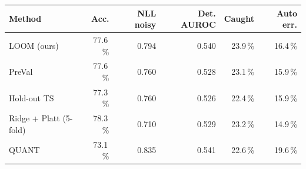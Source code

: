 \begin{tabular}{lrrrrr}
\toprule
Method & Acc. & NLL noisy & Det. AUROC & Caught & Auto err. \\
\midrule
LOOM (ours) & 77.6\,\% & 0.794 & 0.540 & 23.9\,\% & 16.4\,\% \\
PreVal & 77.6\,\% & 0.760 & 0.528 & 23.1\,\% & 15.9\,\% \\
Hold-out TS & 77.3\,\% & 0.760 & 0.526 & 22.4\,\% & 15.9\,\% \\
Ridge + Platt (5-fold) & 78.3\,\% & 0.710 & 0.529 & 23.2\,\% & 14.9\,\% \\
QUANT & 73.1\,\% & 0.835 & 0.541 & 22.6\,\% & 19.6\,\% \\
\bottomrule
\end{tabular}
